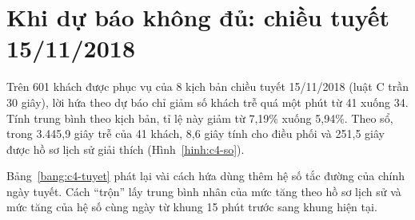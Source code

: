 \section{Khi dự báo không đủ: chiều tuyết 15/11/2018}
\label{muc:c4-tuyet}

Trên 601 khách được phục vụ của 8 kịch bản chiều tuyết 15/11/2018 (luật C trần 30 giây), lời hứa theo dự báo chỉ giảm
số khách trễ quá một phút từ 41 xuống 34. Tính trung bình theo kịch bản, tỉ lệ này giảm từ 7,19\% xuống 5,94\%. Theo
sổ, trong 3.445,9 giây trễ của 41 khách, 8,6 giây tính cho điều phối và 251,5 giây được hồ sơ lịch sử giải thích
(Hình~\ref{hinh:c4-so}).

Bảng~\ref{bang:c4-tuyet} phát lại vài cách hứa dùng thêm hệ số tắc đường của chính ngày tuyết. Cách ``trộn'' lấy trung
bình nhân của mức tăng theo hồ sơ lịch sử và mức tăng của hệ số cùng ngày từ khung 15 phút trước sang khung hiện tại.


